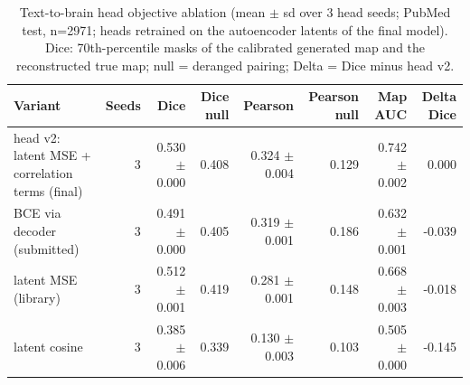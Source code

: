 \begin{table}[t]
\centering
\small
\caption{Text-to-brain head objective ablation (mean $\pm$ sd over 3 head seeds; PubMed test, n=2971; heads retrained on the autoencoder latents of the final model). Dice: 70th-percentile masks of the calibrated generated map and the reconstructed true map; null = deranged pairing; Delta = Dice minus head v2.}
\label{tab:a5_loss_t2b}
\begin{tabular}{lrrrrrrr}
\toprule
Variant & Seeds & Dice & Dice null & Pearson & Pearson null & Map AUC & Delta Dice \\
\midrule
head v2: latent MSE + correlation terms (final) & 3 & 0.530 $\pm$ 0.000 & 0.408 & 0.324 $\pm$ 0.004 & 0.129 & 0.742 $\pm$ 0.002 & 0.000 \\
BCE via decoder (submitted) & 3 & 0.491 $\pm$ 0.000 & 0.405 & 0.319 $\pm$ 0.001 & 0.186 & 0.632 $\pm$ 0.001 & -0.039 \\
latent MSE (library) & 3 & 0.512 $\pm$ 0.001 & 0.419 & 0.281 $\pm$ 0.001 & 0.148 & 0.668 $\pm$ 0.003 & -0.018 \\
latent cosine & 3 & 0.385 $\pm$ 0.006 & 0.339 & 0.130 $\pm$ 0.003 & 0.103 & 0.505 $\pm$ 0.000 & -0.145 \\
\bottomrule
\end{tabular}
\end{table}
